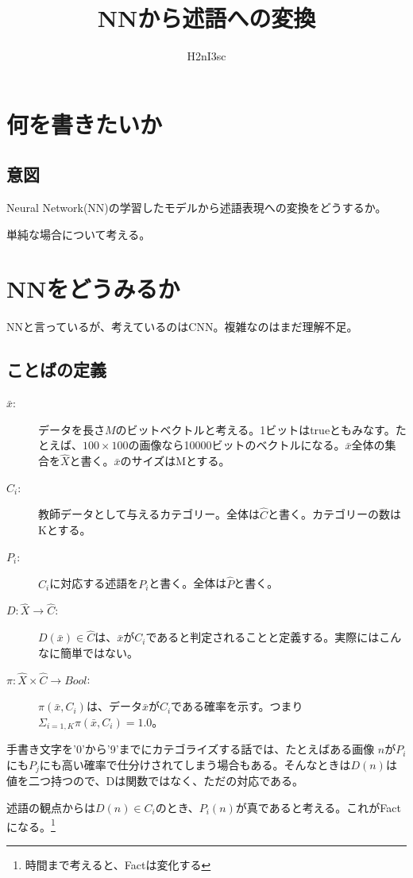 \documentclass[10pt, oneside]{jarticle}   	%
\title{NNから述語への変換}
\author{H2nI3sc}
\begin{document}
\maketitle

\section{何を書きたいか}
\subsection{意図}
Neural Network(NN)の学習したモデルから述語表現への変換をどうするか。

単純な場合について考える。

\section{NNをどうみるか}
NNと言っているが、考えているのはCNN。複雑なのはまだ理解不足。

\subsection{ことばの定義}
\begin{description}
\item[$\bar{x}$: ] データを長さ$M$のビットベクトルと考える。1ビットはtrueともみなす。たとえば、$100\times 100$の画像なら10000ビットのベクトルになる。$\bar{x}$全体の集合を$\hat{X}$と書く。$\bar{x}$のサイズはMとする。
\item[$C_i$:] 教師データとして与えるカテゴリー。全体は$\hat{C}$と書く。カテゴリーの数はKとする。
\item[$P_i$:] $C_i$に対応する述語を$P_i$と書く。全体は$\hat{P}$と書く。
\item[$D: \hat{X} \rightarrow \hat{C}$:] $D(\bar{x}) \in \hat{C}$は、$\bar{x}$が$C_i$であると判定されることと定義する。実際にはこんなに簡単ではない。
\item[$\pi: \hat{X} \times \hat{C} \rightarrow Bool$: ] $\pi(\bar{x}, C_i)$は、データ$\bar{x}$が$C_i$である確率を示す。つまり$\Sigma_{i=1,K} \pi(\bar{x},C_i) = 1.0$。
\end{description}

手書き文字を'0'から'9'までにカテゴライズする話では、たとえばある画像 $n$が$P_i$にも$P_j$にも高い確率で仕分けされてしまう場合もある。そんなときは$D(n)$は値を二つ持つので、Dは関数ではなく、ただの対応である。

述語の観点からは$D(n) \in C_i$のとき、$P_i(n)$が真であると考える。これがFactになる。\footnote{時間まで考えると、Factは変化する}
\end{document}
